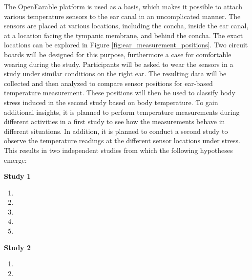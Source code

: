 The OpenEarable platform is used as a basis, which makes it possible to attach various temperature sensors to the ear canal in an uncomplicated manner. 
The sensors are placed at various locations, including the concha, inside the ear canal, at a location facing the tympanic membrane, and behind the concha.
The exact locations can be explored in Figure \ref{fig:ear_measurement_positions}.
Two circuit boards will be designed for this purpose, furthermore a case for comfortable wearing during the study.
Participants will be asked to wear the sensors in a study under similar conditions on the right ear.
The resulting data will be collected and then analyzed to compare sensor positions for ear-based temperature measurement. 
These positions will then be used to classify body stress induced in the second study based on body temperature.
To gain additional insights, it is planned to perform temperature measurements during different activities in a first study to see how the measurements behave in different situations. 
In addition, it is planned to conduct a second study to observe the temperature readings at the different sensor locations under stress.
This results in two independent studies from which the following hypotheses emerge:

\textbf{Study 1}
\begin{enumerate}[label=H\arabic{*}:]
  \item {}
  \item {}
  \item {}
  \item {}
  \item {}
\end{enumerate}

\textbf{Study 2}
\begin{enumerate}[label=H\arabic{*}:]
  \item {}
  \item {}
\end{enumerate}

